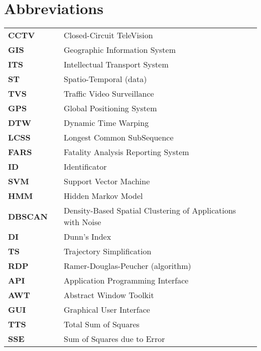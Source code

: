 \section*{Abbreviations}
\label{ch:Abbreviations}

\begin{tabular}{lll}
	\\
	\textbf{CCTV}       & & {Closed-Circuit TeleVision} \\[0.5ex]	
	\textbf{GIS}        & & {Geographic Information System} \\[0.5ex]
	\textbf{ITS}        & & {Intellectual Transport System} \\[0.5ex]
	\textbf{ST}         & & {Spatio-Temporal (data)} \\[0.5ex]
	\textbf{TVS}        & & {Traffic Video Surveillance} \\[0.5ex]
	\textbf{GPS}        & & {Global Positioning System} \\[0.5ex]
	\textbf{DTW}        & & {Dynamic Time Warping} \\[0.5ex]
	\textbf{LCSS}       & & {Longest Common SubSequence} \\[0.5ex]
	\textbf{FARS}       & & {Fatality Analysis Reporting System} \\[0.5ex]
	\textbf{ID}			& & {Identificator} \\[0.5ex]
	\textbf{SVM}		& & {Support Vector Machine} \\[0.5ex]
	\textbf{HMM}		& & {Hidden Markov Model} \\[0.5ex]
	\textbf{DBSCAN}		& & {Density-Based Spatial Clustering of Applications with Noise} \\[0.5ex]
	\textbf{DI}			& & {Dunn's Index} \\[0.5ex]
	\textbf{TS}			& & {Trajectory Simplification} \\[0.5ex]
	\textbf{RDP}		& & {Ramer-Douglas-Peucher (algorithm)} \\[0.5ex]
	\textbf{API}		& & {Application Programming Interface} \\[0.5ex]	
	\textbf{AWT}		& & {Abstract Window Toolkit} \\[0.5ex]
	\textbf{GUI}		& & {Graphical User Interface} \\[0.5ex]
	\textbf{TTS}		& & {Total Sum of Squares} \\[0.5ex]
	\textbf{SSE}		& & {Sum of Squares due to Error} \\[0.5ex]

\end{tabular}
